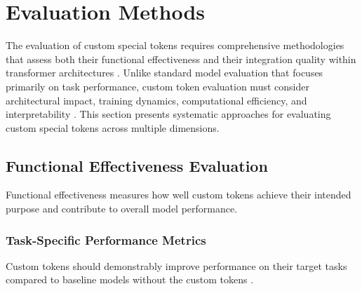 
\section{Evaluation Methods}

The evaluation of custom special tokens requires comprehensive methodologies that assess both their functional effectiveness and their integration quality within transformer architectures \citep{wang2019glue, strubell2019energy}. Unlike standard model evaluation that focuses primarily on task performance, custom token evaluation must consider architectural impact, training dynamics, computational efficiency, and interpretability \citep{hewitt2019structural, jawahar2019does}. This section presents systematic approaches for evaluating custom special tokens across multiple dimensions.
\begin{comment}
Feedback: Before diving into the specifics, it's helpful to establish the core questions a good evaluation should answer. For example: "A robust evaluation framework for a custom token should answer three key questions:
1.  **Does it work?** (Ablation Studies): Does the token actually improve performance on the target task compared to a model without it?
2.  **Is it learning what we think it's learning?** (Probing Tasks): Does the token's embedding actually encode the specific information we designed it to capture?
3.  **How does it change the model's behavior?** (Behavioral Analysis): How does the token affect the model's attention patterns and internal representations?"
\end{comment}

\subsection{Functional Effectiveness Evaluation}

Functional effectiveness measures how well custom tokens achieve their intended purpose and contribute to overall model performance.

\subsubsection{Task-Specific Performance Metrics}

Custom tokens should demonstrably improve performance on their target tasks compared to baseline models without the custom tokens \citep{wang2019glue}.

